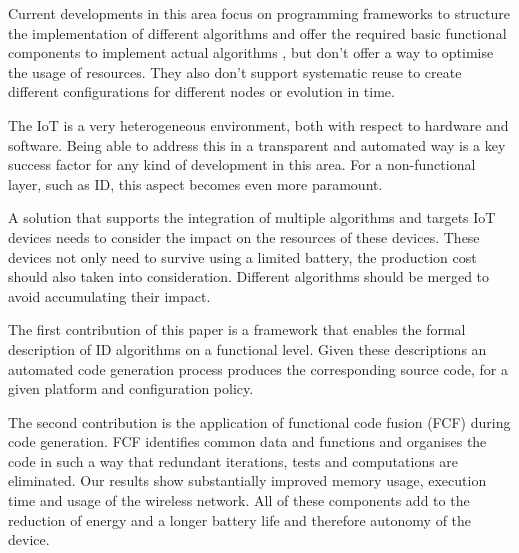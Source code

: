 \documentclass[conference]{IEEEtran}
\begin{document}

Current developments in this area focus on programming frameworks to structure
the implementation of different algorithms \cite{valero2012di} and offer the
required basic functional components to implement actual algorithms
\cite{krontiris2008lidea}, but don't offer a way to optimise the usage of
resources. They also don't support systematic reuse to create different
configurations for different nodes or evolution in time.


The IoT is a very heterogeneous environment, both with respect to hardware and
software. Being able to address this in a transparent and automated way is a
key success factor for any kind of development in this area. For a
non-functional layer, such as ID, this aspect becomes even more paramount.

A solution that supports the integration of multiple algorithms and targets IoT
devices needs to consider the impact on the resources of these devices. These
devices not only need to survive using a limited battery, the production cost
should also taken into consideration. Different algorithms should be merged to
avoid accumulating their impact.




The first contribution of this paper is a framework that enables the formal
description of ID algorithms on a functional level. Given these descriptions an
automated code generation process produces the corresponding source code, for a
given platform and configuration policy.

The second contribution is the application of functional code fusion (FCF)
during code generation. FCF identifies common data and functions and organises
the code in such a way that redundant iterations, tests and computations are
eliminated. Our results show substantially improved memory usage, execution
time and usage of the wireless network. All of these components add to the
reduction of energy and a longer battery life and therefore autonomy of the
device.
\end{document}
